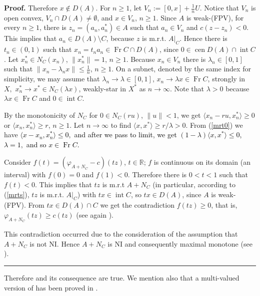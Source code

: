 \documentclass[english]{article}
\newenvironment{proof}[1][Proof]{\noindent\textbf{#1.} }{\ \rule{0.5em}{0.5em}}
\begin{document}
\begin{proof}
Therefore $x\not\in D(A)$. For $n\ge1$, let $V_{n}:=[0,x]+\frac{1}{n}U$.
Notice that $V_{n}$ is open convex, $V_{n}\cap D(A)\neq\emptyset$,
and $x\in V_{n}$, $n\ge1$. Since $A$ is weak-(FPV), for every $n\ge1$,
there is $z_{n}=(a_{n},a_{n}^{*})\in A$ such that $a_{n}\in V_{n}$
and $c(z-z_{n})<0$. This implies that $a_{n}\in D(A)\setminus C$,
because $z$ is m.r.t. $A|_{C}$. Hence there is $t_{n}\in(0,1)$
such that $x_{n}=t_{n}a_{n}\in\operatorname*{Fr}C\cap D(A)$, since
$0\in\operatorname*{cen}D(A)\cap\operatorname*{int}C$. Let $x_{n}^{*}\in N_{C}(x_{n})$,
$\|x_{n}^{*}\|=1$, $n\ge1$. Because $x_{n}\in V_{n}$ there is $\lambda_{n}\in[0,1]$
such that $\|x_{n}-\lambda_{n}x\|\le\frac{1}{n}$, $n\ge1$. On a
subnet, denoted by the same index for simplicity, we may assume that
$\lambda_{n}\rightarrow\lambda\in[0,1]$, $x_{n}\rightarrow\lambda x\in\operatorname*{Fr}C$,
strongly in $X,$ $x_{n}^{*}\rightarrow x^{*}\in N_{C}(\lambda x)$,
weakly-star in $X^{*}$ as $n\rightarrow\infty$. Note that $\lambda>0$
because $\lambda x\in\operatorname*{Fr}C$ and $0\in\operatorname*{int}C$.

By the monotonicity of $N_{C}$ for $0\in N_{C}(ru)$, $\|u\|<1$,
we get $\langle x_{n}-ru,x_{n}^{*}\rangle\ge0$ or $\langle x_{n},x_{n}^{*}\rangle\ge r$,
$n\ge1$. Let $n\rightarrow\infty$ to find $\langle x,x^{*}\rangle\ge r/\lambda>0$.
From (\ref{mrt0}) we have \textcolor{black}{$\langle x-x_{n},x_{n}^{*}\rangle\le0,$
and after we pass to limit, we get $(1-\lambda)\langle x,x^{*}\rangle\le0$,
$\lambda=1,$ and so $x\in\operatorname*{Fr}C$.}

Consider $f(t)=(\varphi_{A+N_{C}}-c)(tz)$, $t\in\mathbb{R}$;
$f$ is continuous on its domain (an interval) with $f(0)=0$ and
$f(1)<0$. Therefore there is $0<t<1$ such that $f(t)<0$. This implies
that $tz$ is m.r.t $A+N_{C}$ (in particular, according to (\ref{mrts}),
$tz$ is m.r.t. $A|_{C}$) with $tx\in\operatorname*{int}C$, so $tx\in D(A)$,
since $A$ is weak-(FPV). From $tx\in D(A)\cap C$ we get the contradiction
$f(tz)\ge0$, that is, $\varphi_{A+N_{C}}(tz)\ge c(tz)$ (see again
\cite[Prop.\ 2.1\ (d)]{tscr}).

This contradiction occurred due to the consideration
of the assumption that $A+N_{C}$ is not NI. Hence $A+N_{C}$ is NI
and consequently maximal monotone (see \cite[Th.\ 3.4]{tscr}). \end{proof}

\strut

Therefore \cite[Lemma\ 41.3]{MR1723737} and its consequence \cite[Th.\ 41.5]{MR1723737}
are true. We mention also that a multi-valued version of \cite[Th.\ 41.6]{MR1723737}
has been proved in \cite{Bau-arxiv}.
\end{document}
